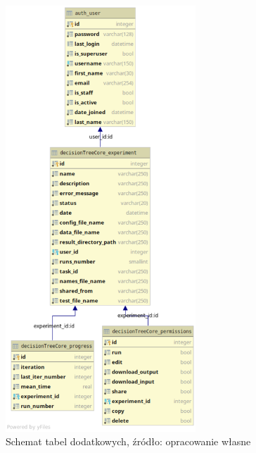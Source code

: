  
\begin{figure}[htb]
	\centering
	\includegraphics[height=16cm]{grafika/database_schema_2.eps}
	\caption{Schemat tabel dodatkowych, źródło: opracowanie własne}
	\label{rys6_database_schema}
\end{figure}

